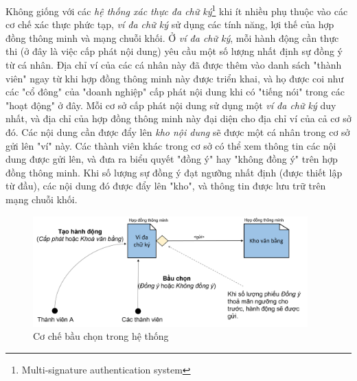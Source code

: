Không giống với các \textit{hệ thống xác thực đa chữ ký}\footnote{Multi-signature authentication system} khi ít nhiều phụ thuộc vào các cơ chế xác thực phức tạp, \textit{ví đa chữ ký} sử dụng các tính năng, lợi thế của hợp đồng thông minh và mạng chuỗi khối. Ở \textit{ví đa chữ ký}, mỗi hành động cần thực thi (ở đây là việc cấp phát nội dung) yêu cầu một số lượng nhất định sự đồng ý từ cá nhân. Địa chỉ ví của các cá nhân này đã được thêm vào danh sách "thành viên" ngay từ khi hợp đồng thông minh này được triển khai, và họ được coi như các "cổ đông" của "doanh nghiệp" cấp phát nội dung khi có "tiếng nói" trong các "hoạt động" ở đây. Mỗi cơ sở cấp phát nội dung sử dụng một \textit{ví đa chữ ký} duy nhất, và địa chỉ của hợp đồng thông minh này đại diện cho địa chỉ ví của cả cơ sở đó. Các nội dung cần được đẩy lên \textit{kho nội dung} sẽ được một cá nhân trong cơ sở gửi lên "ví" này. Các thành viên khác trong cơ sở có thể xem thông tin các nội dung được gửi lên, và đưa ra biểu quyết "đồng ý" hay "không đồng ý" trên hợp đồng thông minh. Khi số lượng sự đồng ý đạt ngưỡng nhất định (được thiết lập từ đầu), các nội dung đó được đẩy lên "kho", và thông tin được lưu trữ trên mạng chuỗi khối.\\

\begin{figure}[!ht]
    \centering
    \includegraphics[width=400px]{anh/giai-phap/co-che-bau-chon.png}
    \caption{Cơ chế bầu chọn trong hệ thống}
\end{figure}

